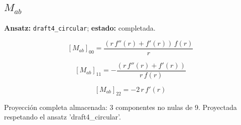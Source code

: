 \documentclass[11pt]{article}
\begin{document}
\subsection*{$ M_{ab} $}
\textbf{Ansatz:} \texttt{draft4\_circular}; \textbf{estado:} completada.\par
\begin{dmath*}[breakdepth={5}]
\left[M_{ab}\right]_{00} = \frac{\left(r\,f''\!\left(r\right) + f'\!\left(r\right)\right)\,f\!\left(r\right)}{r}
\end{dmath*}
\par\smallskip
\begin{dmath*}[breakdepth={5}]
\left[M_{ab}\right]_{11} = -\frac{\left(r\,f''\!\left(r\right) + f'\!\left(r\right)\right)}{r\,f\!\left(r\right)}
\end{dmath*}
\par\smallskip
\begin{dmath*}[breakdepth={5}]
\left[M_{ab}\right]_{22} = -2\,r\,f'\!\left(r\right)
\end{dmath*}
\par\smallskip
Proyección completa almacenada: 3 componentes no nulas de 9. Proyectada respetando el ansatz 'draft4\_circular'.\par\medskip
{}
\end{document}

